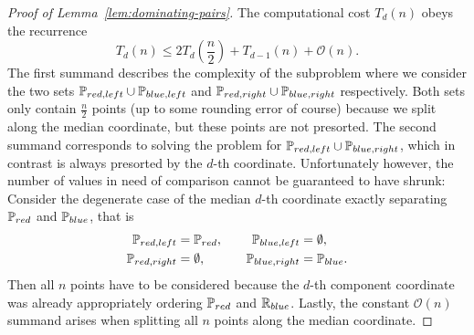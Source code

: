 \begin{proof}[Proof of Lemma~\ref{lem:dominating-pairs}]
    The computational cost $T_d(n)$ obeys the recurrence
    \[
        T_d(n) \leq 2 T_d\left( \frac{n}{2} \right) + T_{d - 1}(n) + \mathcal{O}(n).
    \]
    The first summand describes the complexity of the subproblem where we consider the two sets $\mathbb{P}_{red, left} \cup \mathbb{P}_{blue, left}$ and $\mathbb{P}_{red, right} \cup \mathbb{P}_{blue, right}$ respectively.
    Both sets only contain $\frac{n}{2}$ points (up to some rounding error of course) because we split along the median coordinate, but these points are not presorted.
    The second summand corresponds to solving the problem for $\mathbb{P}_{red, left} \cup \mathbb{P}_{blue, right}$, which in contrast is always presorted by the $d$-th coordinate.
    Unfortunately however, the number of values in need of comparison cannot be guaranteed to have shrunk:
    Consider the degenerate case of the median $d$-th coordinate exactly separating $\mathbb{P}_{red}$ and $\mathbb{P}_{blue}$, that is
    \[
        \begin{split}
            \mathbb{P}_{red, left} &= \mathbb{P}_{red}, \\
            \mathbb{P}_{red, right} &= \emptyset,
        \end{split}
        \qquad
        \begin{split}
            \mathbb{P}_{blue, left} &= \emptyset, \\
            \mathbb{P}_{blue, right} &= \mathbb{P}_{blue}.
        \end{split}
    \]
    Then all $n$ points have to be considered because the $d$-th component coordinate was already appropriately ordering $\mathbb{P}_{red}$ and $\mathbb{R}_{blue}$.
    Lastly, the constant $\mathcal{O}(n)$ summand arises when splitting all $n$ points along the median coordinate.
\end{proof}
